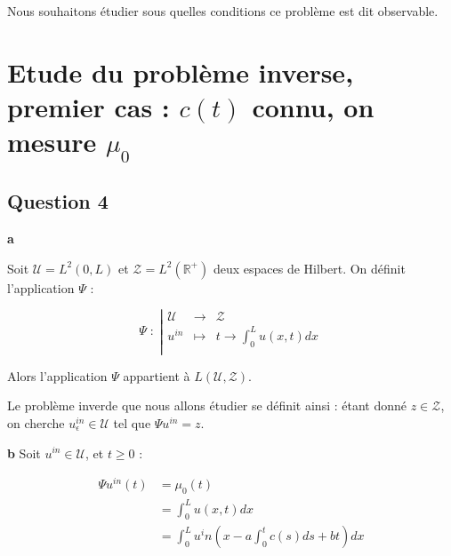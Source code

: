 \documentclass[a4paper]{article}
\newcommand{\Y}{\mathscr{U}}
\newcommand{\Z}{\mathscr{Z}}
\begin{document}
Nous souhaitons étudier sous quelles conditions ce problème est dit observable.


\section{Etude du problème inverse, premier cas : $c(t)$ connu, on mesure $\mu_0$}

\subsection{Question 4}

\textbf{a}

Soit $\Y = L^2(0,L)$ et $\Z = L^2(\mathbb{R}^+)$ deux espaces de Hilbert. 
On définit l'application $\Psi$ :

 \begin{equation}
	 \Psi \; : \; \left\vert
	\begin{array}{ccc}
	\Y & \to & \Z \\
	u^{in} & \mapsto & t \to \int_0^L u(x,t) dx\\
	\end{array} \right.
\end{equation}

Alors l'application $\Psi$ appartient à $L(\Y,\Z)$.

\begin{definition}
Le problème inverde que nous allons étudier se définit ainsi : 
étant donné $z \in \Z$, on cherche $u_{\epsilon}^{in} \in \Y$ 
tel que $\Psi u^{in} = z$.
\end{definition}

\textbf{b}
Soit $u^{in} \in \Y$, et $t \geq 0$ :

\[ \begin{split}
\Psi u^{in}(t) &= \mu_0 (t) \\
               &= \int_0^L u(x,t) dx \\
			   &= \int_0^L u^in( x - a\int_0^tc(s)ds + bt) dx \\
\end{split}\]
\end{document}

